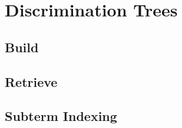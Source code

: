 
\section{Discrimination Trees}

\subsection{Build}
\begin{frame}
	
\end{frame}

\subsection{Retrieve}
\begin{frame}
	
\end{frame}

\subsection{Subterm Indexing}
\begin{frame}
	
\end{frame}